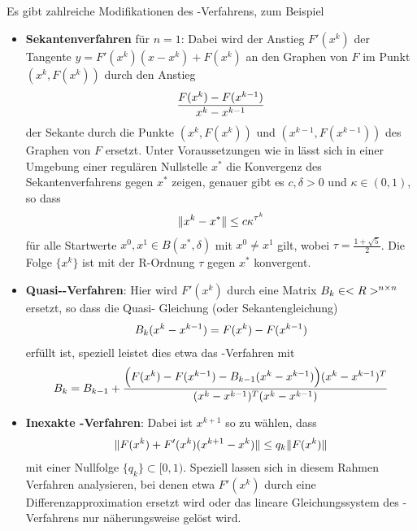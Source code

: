 \begin{remark}
	Es gibt zahlreiche Modifikationen des -Verfahrens, zum Beispiel
	\begin{itemize}
		\item\textbf{Sekantenverfahren} für $n=1$: Dabei wird der Anstieg $F'(x^k)$ der Tangente $y=F'(x^k)(x-x^k)+F(x^k)$ an den Graphen von $F$ im Punkt $(x^k,F(x^k))$ durch den Anstieg
		\begin{align}
			\frac{F(x^k) - F(x^{k-1})}{x^k-x^{k-1}}\notag
		\end{align}
		der Sekante durch die Punkte $(x^k,F(x^k))$ und $(x^{k-1},F(x^{k-1}))$ des Graphen von $F$ ersetzt. Unter Voraussetzungen wie in  lässt sich in einer Umgebung einer regulären Nullstelle $x^\ast$ die Konvergenz des Sekantenverfahrens gegen $x^\ast$ zeigen, genauer gibt es $c,\delta>0$ und $\kappa\in (0,1)$, so dass
		\begin{align}
			\Vert x^k-x^\ast\Vert \le c\kappa^{\tau^k}\notag
		\end{align}
		für alle Startwerte $x^0,x^1\in B(x^\ast,\delta)$ mit $x^0\neq x^1$ gilt, wobei $\tau = \frac{1+\sqrt{5}}{2}$. Die Folge $\{x^k\}$ ist mit der R-Ordnung $\tau$ gegen $x^\ast$ konvergent.
		\item\textbf{Quasi--Verfahren}: Hier wird $F'(x^k)$ durch eine Matrix $B_k\in<R>^{n\times n}$ ersetzt, so dass die Quasi- Gleichung (oder Sekantengleichung)
		\begin{align}
			B_k(x^k-x^{k-1}) = F(x^k) - F(x^{k-1})\notag
		\end{align}
		erfüllt ist, speziell leistet dies etwa das -Verfahren mit
		\begin{align}
			B_k= B_{k-1} + \frac{\Big(F(x^k) - F(x^{k-1}) - B_{k-1}(x^k - x^{k-1})\Big)(x^k - x^{k-1})^T}{(x^k - x^{k-1})^T(x^k - x^{k-1})} \notag
		\end{align}
		\item\textbf{Inexakte -Verfahren}: Dabei ist $x^{k+1}$ so zu wählen, dass
		\begin{align}
			\Vert F(x^k) + F'(x^k)(x^{k+1}-x^k)\Vert\le q_k\Vert F(x^k)\Vert\notag
		\end{align}
		mit einer Nullfolge $\{q_k\}\subset[0,1)$. Speziell lassen sich in diesem Rahmen Verfahren analysieren, bei denen etwa $F'(x ^k)$ durch eine Differenzapproximation ersetzt wird oder das lineare Gleichungssystem des -Verfahrens nur näherungsweise gelöst wird.
	\end{itemize}
\end{remark}
